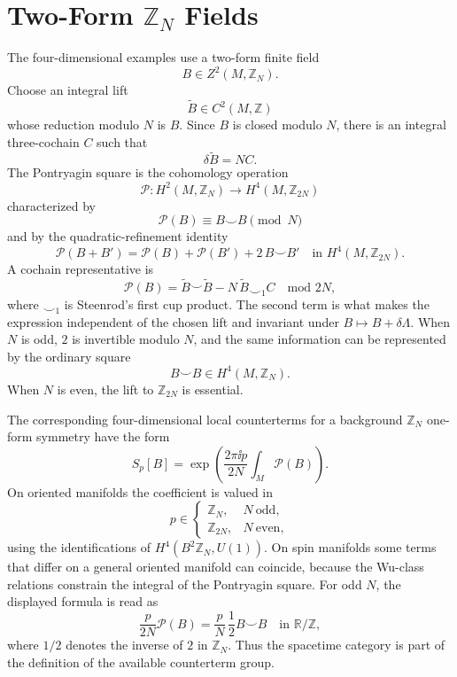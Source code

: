 \section{Two-Form \texorpdfstring{\(\mathbb Z_N\)}{ZN} Fields}

The four-dimensional examples use a two-form finite field
\[
  B\in Z^2(M,\mathbb Z_N).
\]
Choose an integral lift
\[
  \widetilde B\in C^2(M,\mathbb Z)
\]
whose reduction modulo \(N\) is \(B\).  Since \(B\) is closed modulo \(N\),
there is an integral three-cochain \(C\) such that
\[
  \delta\widetilde B=N C .
\]
The Pontryagin square is the cohomology operation
\[
  \mathcal P:H^2(M,\mathbb Z_N)\longrightarrow H^4(M,\mathbb Z_{2N})
\]
characterized by
\[
  \mathcal P(B)\equiv B\smile B \pmod N
\]
and by the quadratic-refinement identity
\[
  \mathcal P(B+B')
  =
  \mathcal P(B)+\mathcal P(B')+2\,B\smile B'
  \quad\text{in }H^4(M,\mathbb Z_{2N}).
\]
A cochain representative is
\[
  \mathcal P(B)
  =
  \widetilde B\smile\widetilde B
  -N\,\widetilde B\smile_1 C
  \quad\text{mod }2N,
\]
where \(\smile_1\) is Steenrod's first cup product.  The second term is what
makes the expression independent of the chosen lift and invariant under
\(B\mapsto B+\delta\Lambda\).  When \(N\) is odd, \(2\) is invertible modulo
\(N\), and the same information can be represented by the ordinary square
\[
  B\smile B\in H^4(M,\mathbb Z_N).
\]
When \(N\) is even, the lift to \(\mathbb Z_{2N}\) is essential.

The corresponding four-dimensional local counterterms for a background
\(\mathbb Z_N\) one-form symmetry have the form
\[
  S_p[B]
  =
  \exp\left(
    \frac{2\pi\ii p}{2N}
    \int_M\mathcal P(B)
  \right).
\]
On oriented manifolds the coefficient is valued in
\[
  p\in
  \begin{cases}
    \mathbb Z_N, & N\ \text{odd},\\
    \mathbb Z_{2N}, & N\ \text{even},
  \end{cases}
\]
using the identifications of \(H^4(B^2\mathbb Z_N,U(1))\).  On spin
manifolds some terms that differ on a general oriented manifold can coincide,
because the Wu-class relations constrain the integral of the Pontryagin
square.  For odd \(N\), the displayed formula is read as
\[
  \frac{p}{2N}\mathcal P(B)
  =
  \frac{p}{N}\,\frac{1}{2}B\smile B
  \quad\text{in }\mathbb R/\mathbb Z,
\]
where \(1/2\) denotes the inverse of \(2\) in \(\mathbb Z_N\).  Thus the
spacetime category is part of the definition of the available counterterm
group.

